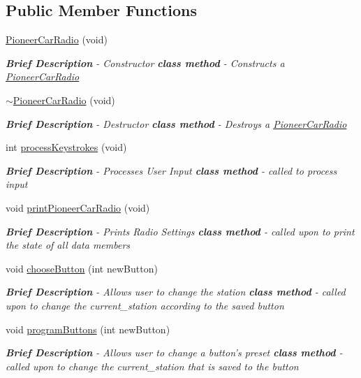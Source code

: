 \subsection*{Public Member Functions}
\begin{DoxyCompactItemize}
\item 
\hyperlink{class_pioneer_car_radio_a540386fa956e18c3d65f3220b095d851}{Pioneer\-Car\-Radio} (void)
\begin{DoxyCompactList}\small\item\em {\bfseries Brief Description} -\/ Constructor {\bfseries {\itshape class method}} -\/ Constructs a \hyperlink{class_pioneer_car_radio}{Pioneer\-Car\-Radio} \end{DoxyCompactList}\item 
\hyperlink{class_pioneer_car_radio_af4ba01a6c3536c3f96560295a49d69a9}{$\sim$\-Pioneer\-Car\-Radio} (void)
\begin{DoxyCompactList}\small\item\em {\bfseries Brief Description} -\/ Destructor {\bfseries {\itshape class method}} -\/ Destroys a \hyperlink{class_pioneer_car_radio}{Pioneer\-Car\-Radio} \end{DoxyCompactList}\item 
int \hyperlink{class_pioneer_car_radio_af9e0e914d89fd33aa9dd940f59c126c1}{process\-Keystrokes} (void)
\begin{DoxyCompactList}\small\item\em {\bfseries Brief Description} -\/ Processes User Input {\bfseries {\itshape class method}} -\/ called to process input \end{DoxyCompactList}\item 
void \hyperlink{class_pioneer_car_radio_a4fce251b9ebf756c7c761091f34a8dcf}{print\-Pioneer\-Car\-Radio} (void)
\begin{DoxyCompactList}\small\item\em {\bfseries Brief Description} -\/ Prints Radio Settings {\bfseries {\itshape class method}} -\/ called upon to print the state of all data members \end{DoxyCompactList}\item 
void \hyperlink{class_pioneer_car_radio_abc73217b1b37a3243161a8e39794ce2f}{choose\-Button} (int new\-Button)
\begin{DoxyCompactList}\small\item\em {\bfseries Brief Description} -\/ Allows user to change the station {\bfseries {\itshape class method}} -\/ called upon to change the current\-\_\-station according to the saved button \end{DoxyCompactList}\item 
void \hyperlink{class_pioneer_car_radio_a6057e01bdbe31625f57f06dfb0456df4}{program\-Buttons} (int new\-Button)
\begin{DoxyCompactList}\small\item\em {\bfseries Brief Description} -\/ Allows user to change a button's preset {\bfseries {\itshape class method}} -\/ called upon to change the current\-\_\-station that is saved to the button \end{DoxyCompactList}\end{DoxyCompactItemize}


